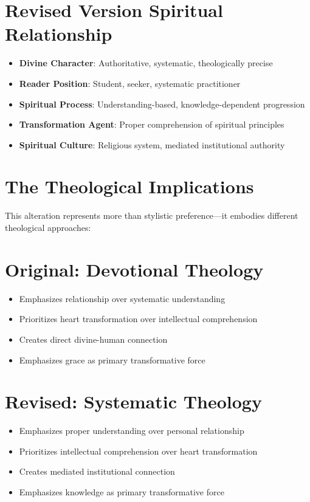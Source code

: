 \documentclass[11pt,twoside]{book}
\begin{document}
\section*{Revised Version Spiritual Relationship}
\label{sec:org974150a}
\begin{itemize}
\item \textbf{\textbf{Divine Character}}: Authoritative, systematic, theologically precise
\item \textbf{\textbf{Reader Position}}: Student, seeker, systematic practitioner
\item \textbf{\textbf{Spiritual Process}}: Understanding-based, knowledge-dependent progression
\item \textbf{\textbf{Transformation Agent}}: Proper comprehension of spiritual principles
\item \textbf{\textbf{Spiritual Culture}}: Religious system, mediated institutional authority
\end{itemize}
\section*{The Theological Implications}
\label{sec:org4e5a0ce}

This alteration represents more than stylistic preference—it embodies different theological approaches:
\section*{Original: Devotional Theology}
\label{sec:org4d8d68d}
\begin{itemize}
\item Emphasizes relationship over systematic understanding
\item Prioritizes heart transformation over intellectual comprehension
\item Creates direct divine-human connection
\item Emphasizes grace as primary transformative force
\end{itemize}
\section*{Revised: Systematic Theology}
\label{sec:orgac7631e}
\begin{itemize}
\item Emphasizes proper understanding over personal relationship
\item Prioritizes intellectual comprehension over heart transformation
\item Creates mediated institutional connection
\item Emphasizes knowledge as primary transformative force
\end{itemize}
\end{document}
